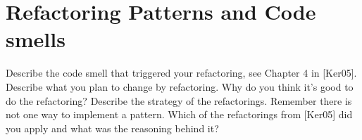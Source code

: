 \section{Refactoring Patterns and Code smells}
Describe the code smell that triggered your refactoring, see Chapter 4 in [Ker05]. 
Describe what you plan to change by refactoring. 
Why do you think it's good to do the refactoring?
Describe the strategy of the refactorings. Remember there is not one way to implement a pattern.
Which of the refactorings from [Ker05] did you apply and what was the reasoning behind it?

